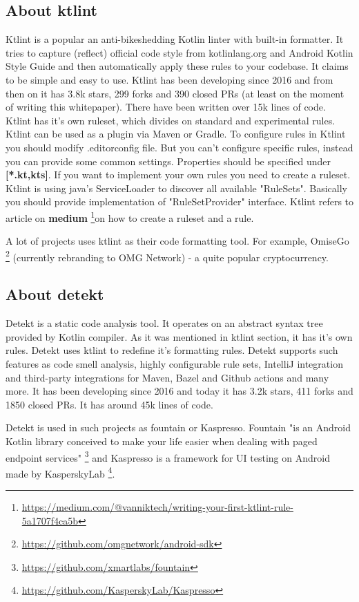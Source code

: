 \subsection{About ktlint}
\par Ktlint is a popular an anti-bikeshedding Kotlin linter with built-in formatter. It tries to capture (reflect) official code style from kotlinlang.org and Android Kotlin Style Guide and then automatically apply these rules to your codebase. It claims to be simple and easy to use. Ktlint has been developing since 2016 and from then on it has 3.8k stars, 299 forks and 390 closed PRs (at least on the moment of writing this whitepaper). There have been written over 15k lines of code. Ktlint has it's own ruleset, which divides on standard and experimental rules. Ktlint can be used as a plugin via Maven or Gradle. To configure rules in Ktlint you should modify .editorconfig file. But you can't configure specific rules, instead you can provide some common settings. Properties should be specified under \textbf{[*.{kt,kts}]}. If you want to implement your own rules you need to create a ruleset. Ktlint is using java's ServiceLoader to discover all available "RuleSets". Basically you should provide implementation of "RuleSetProvider" interface. Ktlint refers to article on \textbf{medium} \footnote{\url{https://medium.com/@vanniktech/writing-your-first-ktlint-rule-5a1707f4ca5b}}on how to create a ruleset and a rule.
\par A lot of projects uses ktlint as their code formatting tool. For example, OmiseGo \footnote{\url{https://github.com/omgnetwork/android-sdk}} (currently rebranding to OMG Network) - a quite popular cryptocurrency.

\subsection{About detekt}
\par Detekt is a static code analysis tool. It operates on an abstract syntax tree provided by Kotlin compiler. As it was mentioned in ktlint section, it has it's own rules. Detekt uses ktlint to redefine it's formatting rules. Detekt supports such features as code smell analysis, highly configurable rule sets, IntelliJ integration and third-party integrations for Maven, Bazel and Github actions and many more. It has been developing since 2016 and today it has 3.2k stars, 411 forks and 1850 closed PRs. It has around 45k lines of code.
\par Detekt is used in such projects as fountain or Kaspresso. Fountain "is an Android Kotlin library conceived to make your life easier when dealing with paged endpoint services" \footnote{\url{https://github.com/xmartlabs/fountain}} and Kaspresso is a framework for UI testing on Android made by KasperskyLab \footnote{\url{https://github.com/KasperskyLab/Kaspresso}}.

